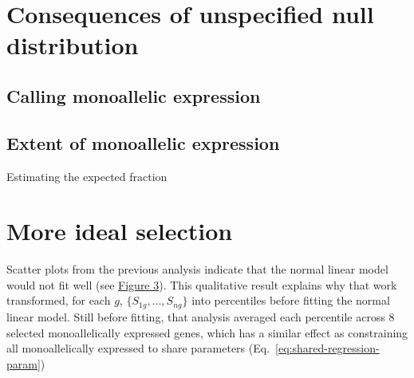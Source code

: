 \documentclass[letterpaper]{article}
\begin{document}
\section{Consequences of unspecified null distribution}
\label{sec:consequences}

\subsection{Calling monoallelic expression}

\subsection{Extent of monoallelic expression}

Estimating the expected fraction \cite{Storey:2003kx}

\section{More ideal selection}
\label{sec:full-specification}

Scatter plots from the previous analysis indicate that the normal linear model
would not fit well (see
\href{https://docs.google.com/presentation/d/1YvpA1AJ-zzir1Iw0F25tO9x8gkSAzqaO4fjB7K3zBhE/edit?usp=sharing}{Figure
3}).
This qualitative result explains why that work transformed, for each \(g\),
\(\{S_{1g},...,S_{ng}\}\) into percentiles before fitting the normal linear model.  Still before fitting, that analysis averaged
each percentile across 8 selected monoallelically expressed genes, which has a similar effect as
constraining all monoallelically expressed to share parameters
(Eq.~\ref{eq:shared-regression-param})


\end{document}
